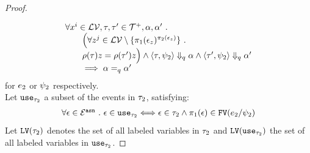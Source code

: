 \begin{proof}
\[\begin{array}{l}
\end{array}
\]
	\[
		\begin{array}{l}
			\forall x^i \in \mathcal{LV}, \mathtt{\tau}, \mathtt{\tau}' \in \mathcal{T}^{+}, \alpha, \alpha' ~.~ 
			\\ \qquad 
		\Big( \forall z^j \in \mathcal{LV} \setminus \{\pi_1(\mathtt{\epsilon}_z)^{\pi_2(\mathtt{\epsilon}_z)} \} ~.~  
		\\ \qquad 
		\rho(\mathtt{\tau}) z = \rho(\mathtt{\tau}') z \Big) \land 
		\langle \mathtt{\tau}, \psi_2 \rangle \Downarrow_q \alpha \land \langle \mathtt{\tau}', \psi_2 \rangle \Downarrow_q \alpha' 
		\\ \qquad 
		\implies \alpha =_{q} \alpha'
	\end{array}
	\]
for $e_2$ or $\psi_2$ respectively.
\\
Let $\mathtt{use}_{\mathtt{\tau}_2}$ a subset of the events in $\mathtt{\tau}_2$, satisfying: 
\[
	\begin{array}{l}
		\forall \mathtt{\epsilon} \in \mathcal{E}^{\mathtt{{asn}}} ~.~  
	\mathtt{\epsilon} \in \mathtt{use}_{\mathtt{\tau}_2} \Longleftrightarrow 
	\mathtt{\epsilon} \in \mathtt{\tau}_2 \land
	\pi_1(\mathtt{\epsilon}) \in \mathtt{FV}(e_2 / \psi_2)
\end{array}		
\]
Let $\mathtt{LV}({\mathtt{\tau}_2}) $ denotes the set of all labeled variables in $\mathtt{\tau}_2$
and $\mathtt{LV}({\mathtt{use}_{\mathtt{\tau}_2}})$ the set of all labeled variables in ${\mathtt{use}_{\mathtt{\tau}_2}}$.


\end{proof}
